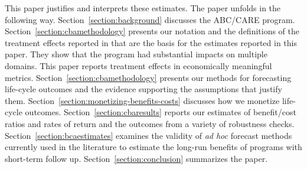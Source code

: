 This paper justifies and interprets these estimates. The paper unfolds in the following way. Section~\ref{section:background} discusses the ABC/CARE program. Section~\ref{section:cbamethodology} presents our notation and the definitions of the treatment effects reported in \cite{Garcia_Heckman_Ziff_2017_Gender-Diff_UNPUBLISHED} that are the basis for the estimates reported in this paper. They show that the program had substantial impacts on multiple domains. This paper reports treatment effects in economically meaningful metrics.  Section~\ref{section:cbamethodology} presents our methods for forecasting life-cycle outcomes and the evidence supporting the assumptions that justify them. Section~\ref{section:monetizing-benefits-costs} discusses how we monetize life-cycle outcomes. Section~\ref{section:cbaresults} reports our estimates of benefit/cost ratios and rates of return and the outcomes from a variety of robustness checks. Section~\ref{section:bcaestimates} examines the validity of \emph{ad hoc} forecast methods currently used in the literature to estimate the long-run benefits of programs with short-term follow up. Section~\ref{section:conclusion} summarizes the paper.

